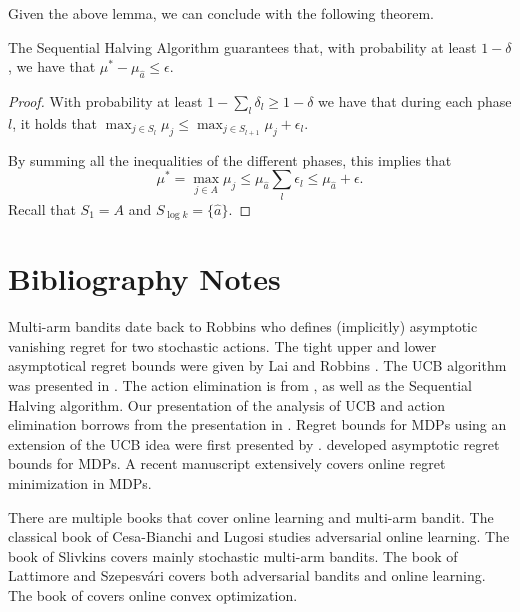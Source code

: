 Given the above lemma, we can conclude with the following theorem.

\begin{theorem}
The Sequential Halving Algorithm guarantees that, with probability at least $1-\delta$, we have that $\mu^*-\mu_{\hat{a}}\leq \epsilon$.
\end{theorem}

\begin{proof}
With probability at least $1- \sum_l \delta_l \geq 1-\delta$ we have that during each phase $l$, it holds that $\max_{j\in
S_{l}}\mu_{j} \leq \max_{j\in S_{l+1}}\mu_{j}+ \epsilon_{l}$.

By summing all the inequalities of the different phases,
this implies that
\[
\mu^*=\max_{j\in
A} \mu_{j} \leq \mu_{\hat{a}} \sum_l \epsilon_{l}\leq \mu_{\hat{a}} +\epsilon.
\]
Recall that $S_1=A$ and $S_{\log k} =\{\hat{a}\}$.
\end{proof}

\section{Bibliography Notes}

Multi-arm bandits date back to Robbins \cite{Robbins52} who defines (implicitly) asymptotic vanishing regret for two stochastic actions. The tight upper and lower asymptotical regret bounds were given by Lai and Robbins \cite{LaiR85}. The UCB algorithm was presented in \cite{AuerCF02}. The action elimination is from \cite{Even-DarMM06}, as well as the Sequential Halving algorithm. Our presentation of the analysis of UCB and action elimination borrows from the presentation in  \cite{Slivkins-book-19}. Regret bounds for MDPs using an extension of the UCB idea were first presented by \citep{auer2008near}. \citep{burnetas1997optimal} developed asymptotic regret bounds for MDPs. A recent manuscript \citep{agarwal2019reinforcement} extensively covers online regret minimization in MDPs.


There are multiple books that cover online learning and multi-arm bandit. The classical book of Cesa{-}Bianchi and Lugosi \cite{Cesa-Bianchi-Lugosi-book} studies adversarial online learning. The book of Slivkins \cite{Slivkins-book-19} covers mainly stochastic multi-arm bandits. The book of Lattimore and Szepesv{\'a}ri \cite{Lattimore-Csaba-book-2020} covers both adversarial bandits and online learning. The book of \citep{hazan2016introduction} covers online convex optimization.
